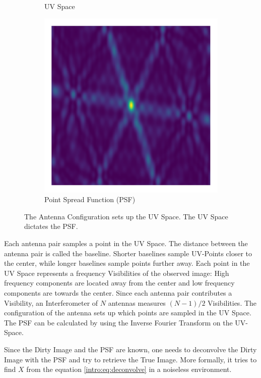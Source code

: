 \begin{figure}[h!]
\begin{subfigure}[b]{0.3\linewidth}
		\caption{UV Space}
	\end{subfigure}
	\begin{subfigure}[b]{0.3\linewidth}
		\includegraphics[width=\linewidth, trim={18px 19px 18px 18px}, clip]{./chapters/01.intro/img/psf.png}
		\caption{Point Spread Function (PSF)}
	\end{subfigure}
	\caption{The Antenna Configuration sets up the UV Space. The UV Space dictates the PSF.}
	\label{intro:ANT_UV_PSF}
\end{figure}

Each antenna pair samples a point in the UV Space. The distance between the antenna pair is called the baseline. Shorter baselines sample UV-Points closer to the center, while longer baselines sample points further away.  Each point in the UV Space represents a frequency Visibilities of the observed image: High frequency components are located away from the center and low frequency components are towards the center. Since each antenna pair contributes a Visibility, an Interferometer of $N$ antennas measures $(N-1)/2$ Visibilities. The configuration of the antenna sets up which points are sampled in the UV Space. The PSF can be calculated by using the Inverse Fourier Transform on the UV-Space.

Since the Dirty Image and the PSF are known, one needs to deconvolve the Dirty Image with the PSF and try to retrieve the True Image. More formally, it tries to find $X$ from the equation \eqref{intro:eq:deconvolve} in a noiseless environment.

